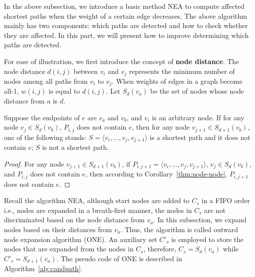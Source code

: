 In the above subsection, we introduce a basic method NEA to compute affected shortest paths when the weight of a certain edge decreases.
The above algorithm mainly has two components: which paths are detected and how to check whether they are affected.
In this part, we will present how to improve determining which paths are detected.

For ease of illustration, we first introduce the concept of \textbf{node distance}. The node distance $d(i,j)$ between $v_i$ and $v_j$ represents the minimum number of nodes among all paths from $v_i$ to $v_j$. When weights of edges in a graph become all-1, $w(i,j)$ is equal to $d(i,j)$.
Let $S_d(v_a)$ be the set of nodes whose node distance from $a$ is $d$.

\begin{corollary}
\label{thm:reduce-end-node}
Suppose the endpoints of $e$ are $v_a$ and $v_b$, and $v_i$ is an arbitrary node. If for any node $v_j \in S_d(v_b)$, $P_{i,j}$ does not contain $e$, then for any node $v_{j+1}\in S_{d+1}(v_b)$, one of the following stands: $S=\langle v_i,...,v_j,v_{j+1}\rangle$ is a shortest path and it does not contain $e$; $S$ is not a shortest path.
\end{corollary}
\begin{proof}
For any node $v_{j+1}\in S_{d+1}(v_b)$, if $P_{i,j+1}=\langle v_i,...,v_j,v_{j+1}\rangle$, $v_j\in S_d(v_b)$, and $P_{i,j}$ does not contain $e$, then according to Corollary~\ref{thm:node-node}, $P_{i,j+1}$ does not contain $e$.
\end{proof}

Recall the algorithm NEA, although start nodes are added to $C_s$ in a FIFO order i.e., nodes are expanded in a breath-first manner, the nodes in $C_s$ are not discriminated based on the node distance from $v_a$.
In this subsection, we expand nodes based on their distances from $v_a$. Thus, the algorithm is called outward node expansion algorithm (ONE).
An auxiliary set $C'_s$ is employed to store the nodes that are expanded from the nodes in $C_s$, therefore, $C_s=S_{d}(v_a)$ while $C'_s=S_{d+1}(v_a)$.
The pseudo code of ONE is described in Algorithm~\ref{alg:candpath}.

